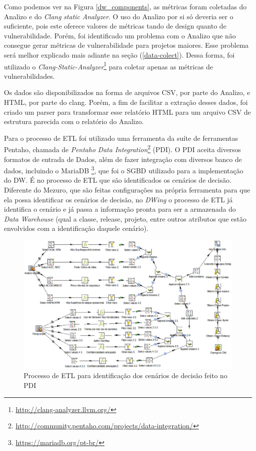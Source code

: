 Como podemos ver na Figura \ref{dw_components}, as métricas foram coletadas do Analizo e do \emph{Clang static Analyzer}. O uso do Analizo por si só deveria ser o suficiente, pois este oferece valores de métricas tando de design quanto de vulnerabilidade. Porém, foi identificado um problema com o Analizo que não consegue gerar métricas de vulnerabilidade para projetos maiores. Esse problema será melhor explicado mais adiante na seção (\ref{data-colect}). Dessa forma, foi utilizado o \emph{Clang-Static-Analyzer}\footnote{\url{http://clang-analyzer.llvm.org/}} para coletar apenas as métricas de vulnerabilidades.

%
Os dados são disponibilizados na forma de arquivos CSV, por parte do Analizo, e HTML, por parte do clang. Porém, a fim de facilitar a extração desses dados, foi criado um parser para transformar esse relatório HTML para um arquivo CSV de estrutura parecida com o relatório do Analizo.


Para o processo de ETL foi utilizado uma ferramenta da suíte de ferramentas Pentaho, chamada de \emph{Pentaho Data Integration}\footnote{\url{http://community.pentaho.com/projects/data-integration/}} (PDI). O PDI aceita diversos formatos de entrada de Dados, além de fazer integração com diversos banco de dados, incluindo o MariaDB \footnote{\url{https://mariadb.org/pt-br/}}, que foi o SGBD utilizado para a implementação do DW. É no processo de ETL que são identificados os cenários de decisão. Diferente do Mezuro, que são feitas configurações na própria ferramenta para que ela possa identificar os cenários de decisão, no \emph{DWing} o processo de ETL já identifica o cenário e já passa a informação pronta para ser a armazenada do \emph{Data Warehouse} (qual a classe, release, projeto, entre outros atributos que estão envolvidos com a identificação daquele cenário).


\begin{figure}[H]
 	\centering
 		\includegraphics[scale=0.5]{figuras/dw-etlpdi}
 		\caption{Processo de ETL para identificação dos cenários de decisão feito no PDI}
 		\label{dw-etl-pdi}
 \end{figure}

